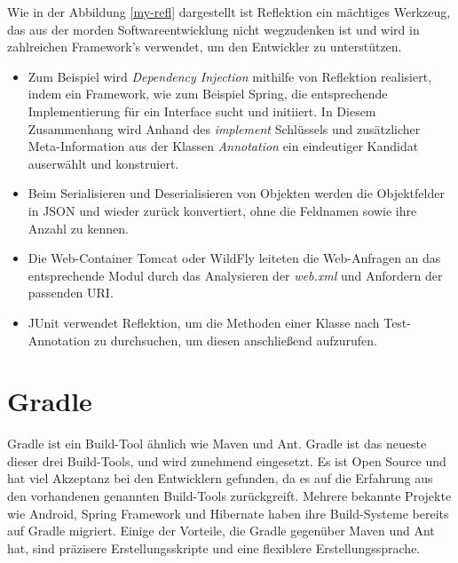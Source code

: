   Wie in der Abbildung \ref{my-refl} dargestellt ist Reflektion ein mächtiges Werkzeug, das aus der morden Softwareentwicklung nicht wegzudenken ist und wird in zahlreichen Framework's verwendet, um den Entwickler zu unterstützen. 

  \begin{itemize}
    \item Zum Beispiel wird \textit{Dependency Injection} mithilfe von Reflektion realisiert, indem ein Framework, wie zum Beispiel Spring, die entsprechende Implementierung für ein Interface sucht und initiiert. In Diesem Zusammenhang wird Anhand des \textit{implement} Schlüssels und zusätzlicher Meta-Information aus der Klassen \textit{Annotation} ein eindeutiger Kandidat auserwählt und konstruiert.
    \item Beim Serialisieren und Deserialisieren von Objekten werden die Objektfelder in JSON und wieder zurück konvertiert, ohne die Feldnamen sowie ihre Anzahl zu kennen.
    \item Die Web-Container Tomcat oder WildFly leiteten die Web-Anfragen an das entsprechende Modul durch das Analysieren der \textit{web.xml} und Anfordern der passenden URI.
    \item JUnit verwendet Reflektion, um die Methoden einer Klasse nach Test-Annotation zu durchsuchen, um diesen anschließend aufzurufen.
  \end{itemize}

\section{Gradle}
Gradle ist ein Build-Tool ähnlich wie Maven und Ant. Gradle ist das neueste dieser drei Build-Tools, und wird zunehmend eingesetzt. Es ist Open Source und hat viel Akzeptanz bei den Entwicklern gefunden, da es auf die Erfahrung aus den vorhandenen genannten Build-Tools zurückgreift. Mehrere bekannte Projekte wie Android, Spring Framework und Hibernate haben ihre Build-Systeme bereits auf Gradle migriert. Einige der Vorteile, die Gradle gegenüber Maven und Ant hat, sind präzisere Erstellungsskripte und eine flexiblere Erstellungssprache.\bigbreak

